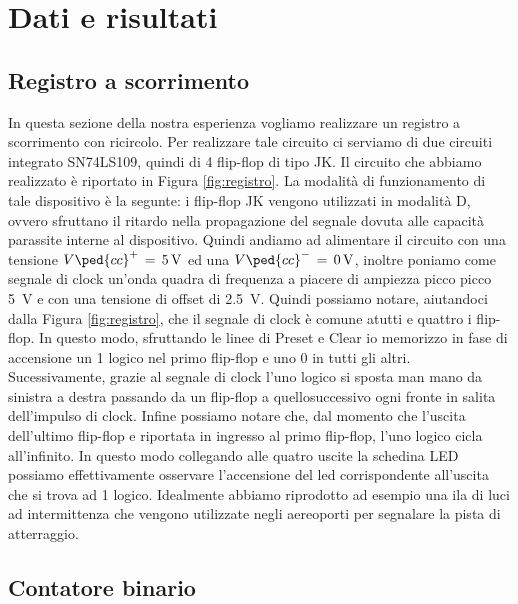 \section*{Dati e risultati}

\subsection*{Registro a scorrimento}

In questa sezione della nostra esperienza vogliamo realizzare un registro a scorrimento con ricircolo. Per realizzare tale circuito ci serviamo di due circuiti integrato SN74LS109, quindi di 4 flip-flop di tipo JK. Il circuito che abbiamo realizzato è riportato in Figura \ref{fig:registro}.
La modalità di funzionamento di tale dispositivo è la segunte: i flip-flop JK vengono utilizzati in modalità D, ovvero sfruttano il ritardo nella propagazione del segnale dovuta alle capacità parassite interne al dispositivo.
Quindi andiamo ad alimentare il circuito con una tensione $V\ped{cc}^+\,=\,\SI{+5}{\volt}$ ed una $V\ped{cc}^-\,=\,\SI{0}{\volt}$, inoltre poniamo come segnale di clock un'onda quadra di frequenza a piacere di ampiezza picco picco \SI{5}{\volt} e con una tensione di offset di \SI{+2.5}{\volt}.
Quindi possiamo notare, aiutandoci dalla Figura \ref{fig:registro}, che il segnale di clock è comune atutti e quattro i flip-flop. In questo modo, sfruttando le linee di Preset e Clear io memorizzo in fase di accensione un 1 logico nel primo flip-flop e uno 0 in tutti gli altri. Sucessivamente, grazie al segnale di clock l'uno logico si sposta man mano da sinistra a destra passando da un flip-flop a quellosuccessivo ogni fronte in salita dell'impulso di clock. Infine possiamo notare che, dal momento che l'uscita dell'ultimo flip-flop e riportata in ingresso al primo flip-flop, l'uno logico cicla all'infinito. In questo modo collegando alle quatro uscite la schedina LED possiamo effettivamente osservare l'accensione del led corrispondente all'uscita che si trova ad 1 logico.
Idealmente abbiamo riprodotto ad esempio una ila di luci ad intermittenza che vengono utilizzate negli aereoporti per segnalare la pista di atterraggio.

\subsection*{Contatore binario}

